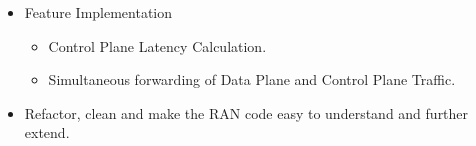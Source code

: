\begin{itemize}
	\item Feature Implementation
	\begin{itemize}
		\item Control Plane Latency Calculation.
		\item Simultaneous forwarding of Data Plane and Control Plane Traffic.
	\end{itemize}
	\item Refactor, clean and make the RAN code easy to understand and further extend.
\end{itemize}
%
